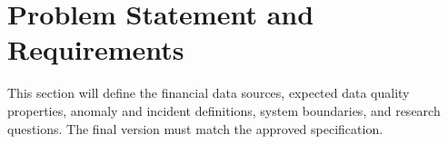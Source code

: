 \section{Problem Statement and Requirements}
\label{sec:problem}
This section will define the financial data sources, expected data quality
properties, anomaly and incident definitions, system boundaries, and
research questions. The final version must match the approved specification.
